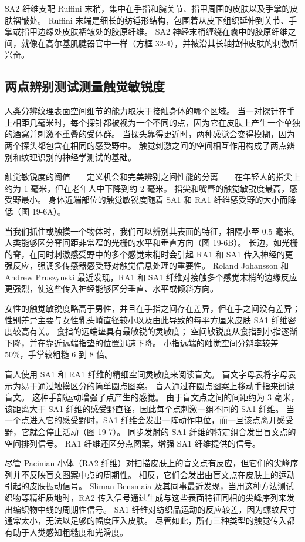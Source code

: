 SA2 纤维支配 Ruffini 末梢，集中在手指和腕关节、指甲周围的皮肤以及手掌的皮肤褶皱处。 Ruffini 末端是细长的纺锤形结构，包围着从皮下组织延伸到关节、手掌或指甲边缘处皮肤褶皱处的胶原纤维。 SA2 神经末梢缠绕在囊中的胶原纤维之间，就像在高尔基肌腱器官中一样（方框 32-4），并被沿其长轴拉伸皮肤的刺激所兴奋。


\subsection{两点辨别测试测量触觉敏锐度}
人类分辨纹理表面空间细节的能力取决于接触身体的哪个区域。 当一对探针在手上相距几毫米时，每个探针都被视为一个不同的点，因为它在皮肤上产生一个单独的酒窝并刺激不重叠的受体群。 当探头靠得更近时，两种感觉会变得模糊，因为两个探头都包含在相同的感受野中。 触觉刺激之间的空间相互作用构成了两点辨别和纹理识别的神经学测试的基础。

触觉敏锐度的阈值——定义机会和完美辨别之间性能的分离——在年轻人的指尖上约为 1 毫米，但在老年人中下降到约 2 毫米。 指尖和嘴唇的触觉敏锐度最高，感受野最小。 身体近端部位的触觉敏锐度随着 SA1 和 RA1 纤维感受野的大小而降低（图 19-6A）。

当我们抓住或触摸一个物体时，我们可以辨别其表面的特征，相隔小至 0.5 毫米。 人类能够区分脊间距非常窄的光栅的水平和垂直方向（图 19-6B）。 长边，如光栅的脊，在同时刺激感受野中的多个感觉末梢时会引起 RA1 和 SA1 传入神经的更强反应，强调多传感器感受野对触觉信息处理的重要性。 Roland Johansson 和 Andrew Pruszynski 最近发现，RA1 和 SA1 纤维对接触多个感觉末梢的边缘反应更强烈，使这些传入神经能够区分垂直、水平或倾斜方向。

女性的触觉敏锐度略高于男性，并且在手指之间存在差异，但在手之间没有差异； 性别差异主要与女性乳头嵴直径较小以及由此导致的每平方厘米皮肤 SA1 纤维密度较高有关。 食指的远端垫具有最敏锐的灵敏度； 空间敏锐度从食指到小指逐渐下降，并在靠近远端指垫的位置迅速下降。 小指远端的触觉空间分辨率较差 50\%，手掌较粗糙 6 到 8 倍。

盲人使用 SA1 和 RA1 纤维的精细空间灵敏度来阅读盲文。 盲文字母表将字母表示为易于通过触摸区分的简单圆点图案。 盲人通过在圆点图案上移动手指来阅读盲文。 这种手部运动增强了点产生的感觉。 由于盲文点之间的间距约为 3 毫米，该距离大于 SA1 纤维的感受野直径，因此每个点刺激一组不同的 SA1 纤维。 当一个点进入它的感受野时，SA1 纤维会发出一阵动作电位，而一旦该点离开感受野，它就会停止活动（图 19-7）。 同步发射的 SA1 纤维的特定组合发出盲文点的空间排列信号。 RA1 纤维还区分点图案，增强 SA1 纤维提供的信号。

尽管 Pacinian 小体（RA2 纤维）对扫描皮肤上的盲文点有反应，但它们的尖峰序列并不反映盲文图案中点的周期性。 相反，它们会发出由盲文点在皮肤上的运动引起的皮肤振动信号。 Sliman Bensmaia 及其同事最近发现，当用这种方法测试织物等精细质地时，RA2 传入信号通过生成与这些表面特征同相的尖峰序列来发出编织物中线的周期性信号。 SA1 纤维对纺织品运动的反应较差，因为螺纹尺寸通常太小，无法以足够的幅度压入皮肤。 尽管如此，所有三种类型的触觉传入都有助于人类感知粗糙度和光滑度。



